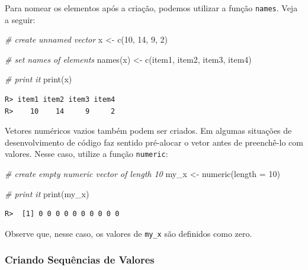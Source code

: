 \documentclass[
  11pt,
]{book}
\newenvironment{Shaded}{\begin{snugshade}}{\end{snugshade}}
\newcommand{\AttributeTok}[1]{\textcolor[rgb]{0.61,0.61,0.61}{#1}}
\newcommand{\CommentTok}[1]{\textcolor[rgb]{0.37,0.37,0.37}{\textit{#1}}}
\newcommand{\DecValTok}[1]{\textcolor[rgb]{0.06,0.06,0.06}{#1}}
\newcommand{\FunctionTok}[1]{\textcolor[rgb]{0,0,0}{#1}}
\newcommand{\NormalTok}[1]{#1}
\newcommand{\OtherTok}[1]{\textcolor[rgb]{0.37,0.37,0.37}{#1}}
\newcommand{\StringTok}[1]{\textcolor[rgb]{0.5,0.5,0.5}{#1}}
\begin{document}
Para nomear os elementos após a criação, podemos utilizar a função \texttt{names}. Veja a seguir:

\begin{Shaded}
\begin{Highlighting}[]
\CommentTok{\# create unnamed vector}
\NormalTok{x }\OtherTok{\textless{}{-}} \FunctionTok{c}\NormalTok{(}\DecValTok{10}\NormalTok{, }\DecValTok{14}\NormalTok{, }\DecValTok{9}\NormalTok{, }\DecValTok{2}\NormalTok{)}

\CommentTok{\# set names of elements}
\FunctionTok{names}\NormalTok{(x) }\OtherTok{\textless{}{-}} \FunctionTok{c}\NormalTok{(}\StringTok{\textquotesingle{}item1\textquotesingle{}}\NormalTok{, }\StringTok{\textquotesingle{}item2\textquotesingle{}}\NormalTok{, }\StringTok{\textquotesingle{}item3\textquotesingle{}}\NormalTok{, }\StringTok{\textquotesingle{}item4\textquotesingle{}}\NormalTok{)}

\CommentTok{\# print it}
\FunctionTok{print}\NormalTok{(x)}
\end{Highlighting}
\end{Shaded}

\begin{verbatim}
R> item1 item2 item3 item4 
R>    10    14     9     2
\end{verbatim}

Vetores numéricos vazios também podem ser criados. Em algumas situações de desenvolvimento de código faz sentido pré-alocar o vetor antes de preenchê-lo com valores. Nesse caso, utilize a função \texttt{numeric}:

\begin{Shaded}
\begin{Highlighting}[]
\CommentTok{\# create empty numeric vector of length 10}
\NormalTok{my\_x }\OtherTok{\textless{}{-}} \FunctionTok{numeric}\NormalTok{(}\AttributeTok{length =} \DecValTok{10}\NormalTok{)}

\CommentTok{\# print it}
\FunctionTok{print}\NormalTok{(my\_x)}
\end{Highlighting}
\end{Shaded}

\begin{verbatim}
R>  [1] 0 0 0 0 0 0 0 0 0 0
\end{verbatim}

Observe que, nesse caso, os valores de \texttt{my\_x} são definidos como zero.

\hypertarget{criando-sequuxeancias-de-valores}{%
\subsubsection{Criando Sequências de Valores}\label{criando-sequuxeancias-de-valores}}
\end{document}
